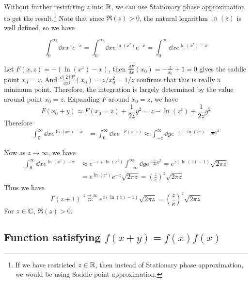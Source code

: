 Without further restricting $z$ into $\mathbb{R}$, we can use Stationary phase approximation
to get the result.\footnote{
    If we have restricted $z\in\mathbb{R}$, then instead of Stationary phase
approximation, we would be using Saddle point approximation.}
Note that since $\Re(z)>0$, the natural logarithm $\ln(z)$ is well
defined, so we have

\begin{equation}
    \int_0^\infty \dd{x} x^z e^{-x} = 
    \int_0^\infty \dd{x} e^{\ln(x^z)} e^{-x} = 
    \int_0^\infty \dd{x} e^{\ln(x^z)-x} 
\end{equation}

Let $F(x,z) = -(\ln(x^z)-x)$, then $\frac{dF}{dx}(x_0)=-\frac{z}{x_0}+1=0$ gives the
saddle point $x_0=z$. And $\frac{\dd[2]{F}}{\dd x^2}(x_0)=z/x_0^2=1/z$
confirms that this is really a minimum point. Therefore, the integration is
largely determined by the value around point $x_0=z$. Expanding $F$ around
$x_0=z$, we have
\begin{equation}
    F(x_0 + y)\approx F(x_0=z) + \frac{1}{2z} y^2 
    = z-\ln(z^z) + \frac{1}{2z}y^2
\end{equation}
Therefore
\begin{align}
    \int_0^\infty \dd{x} e^{\ln(x^z)-x} &= 
    \int_0^\infty \dd{x} e^{-F(x,z)} \approx
    \int_{-z}^\infty \dd{y} e^{-z+\ln(z^z) - \frac{1}{2z}y^2}
\end{align}

Now as $z\to\infty$, we have
\begin{align}
    \int_0^\infty \dd{x} e^{\ln(x^z)-x}
    &\approx e^{-z+\ln(z^z)} \int_{-\infty}^\infty \dd{y} e^{- \frac{1}{2z}y^2} 
    = e^{z(\ln(z)-1)} \sqrt{2\pi z} \nonumber\\
    &= e^{\ln(z^z)}e^{-z}\sqrt{2\pi z}
    = (\frac{z}{e})^z \sqrt{2\pi z}
\end{align}
Thus we have
\begin{equation}
    \Gamma(z+1) \overset{z\to\infty}{\approx} e^{z(\ln(z)-1)} \sqrt{2\pi z}
    = (\frac{z}{e})^z \sqrt{2\pi z}
\end{equation}
For $z\in\mathbb{C}$, $\Re(z)>0$.
\subsection{Function satisfying \texorpdfstring{$f(x+y)=f(x)f(x)$}{}}
\label{sec:Function satisfying \texorpdfstring{$f(x+y)=f(x)f(x)$}{}}

